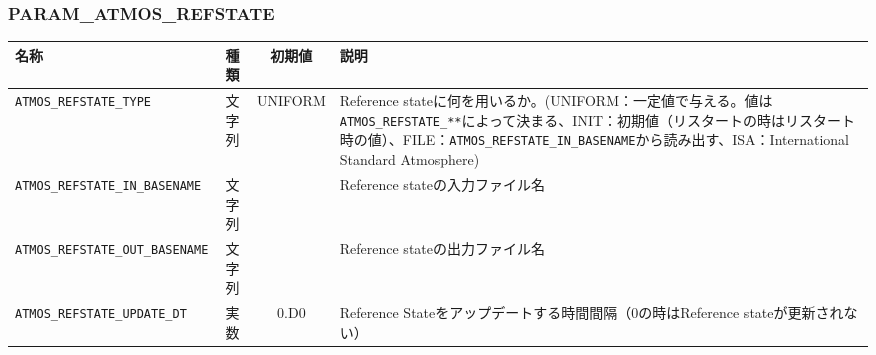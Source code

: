 \subsubsection{PARAM\_ATMOS\_REFSTATE}
\begin{tabularx}{150mm}{|l|c|c|X|} \hline
 \rowcolor[gray]{0.9} 名称 & 種類 & 初期値 & 説明 \\ \hline
 \verb|ATMOS_REFSTATE_TYPE| & 文字列 & UNIFORM & Reference stateに何を用いるか。(UNIFORM：一定値で与える。値は\verb|ATMOS_REFSTATE_**|によって決まる、INIT：初期値（リスタートの時はリスタート時の値）、FILE：\verb|ATMOS_REFSTATE_IN_BASENAME|から読み出す、ISA：International Standard Atmosphere) \\ \hline
 \verb|ATMOS_REFSTATE_IN_BASENAME| & 文字列 & & Reference stateの入力ファイル名 \\ \hline
 \verb|ATMOS_REFSTATE_OUT_BASENAME| & 文字列 & & Reference stateの出力ファイル名 \\ \hline
 \verb|ATMOS_REFSTATE_UPDATE_DT| & 実数 & 0.D0 & Reference Stateをアップデートする時間間隔（0の時はReference stateが更新されない） \\ \hline
\end{tabularx}

